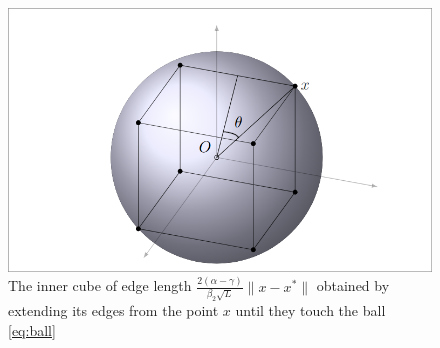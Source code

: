 \documentclass[11pt,a4paper,openright,oneside]{book}
\numberwithin{equation}{section}
\begin{document}
{\begin{figure}

\centering

\includegraphics[width=0.8\linewidth]{media/balls.png}
  \caption{The inner cube of edge length $\frac{2(\alpha - \gamma)}{\beta_2 \sqrt{L}} \|x - x^*\|$ obtained by extending its edges from the point $x$ until they touch the ball \ref{eq:ball} }
  \label{fig:ballhd}
\end{figure}

}
\end{document}
